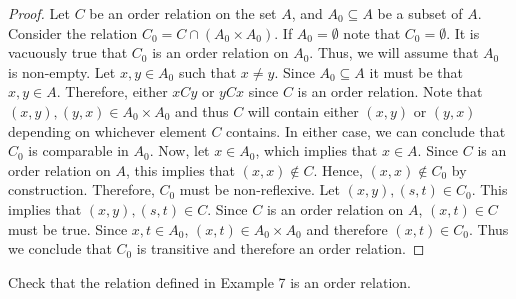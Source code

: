 \documentclass[12pt]{article}
\begin{document}
\begin{proof}
	Let $C$ be an order relation on the set $A$, and $A_0 \subseteq A$ be a subset of $A$. Consider the 
	relation $C_0 = C \cap (A_0 \times A_0)$. If $A_0 = \emptyset$ note that $C_0 = \emptyset$. It is 
	vacuously true that $C_0$ is an order relation on $A_0$. Thus, we will assume that $A_0$ is non-empty.
	Let $x, y \in A_0$ such that $x \neq y$. Since $A_0 \subseteq A$ it must be that $x, y \in A$.
	Therefore, either $xCy$ or $yCx$ since $C$ is an order relation. 
	Note that $(x, y), (y, x) \in A_0 \times A_0$ and thus $C$ will contain either $(x, y)$ or 
	$(y, x)$ depending on whichever element $C$ contains. In either case, we can conclude that 
	$C_0$ is comparable in $A_0$. Now, let $x \in A_0$, which implies that $x \in A$. Since $C$ is an order
	relation on $A$, this implies that $(x, x) \notin C$. Hence, $(x, x) \notin C_0$ by construction.
	Therefore, $C_0$ must be non-reflexive. Let $(x, y), (s, t) \in C_0$. This implies 
	that $(x, y), (s, t) \in C$. Since $C$ is an order relation on $A$, $(x, t) \in C$ must be true.
	Since $x, t \in A_0$, $(x, t) \in A_0 \times A_0$ and therefore $(x, t) \in C_0$. Thus we conclude
	that $C_0$ is transitive and therefore an order relation.
\end{proof}

 Check that the relation defined in Example 7 is an order relation.
\end{document}
